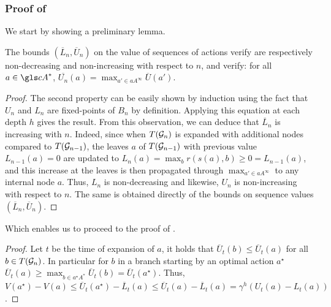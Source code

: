 \subsubsection{Proof of }
\label{sec:proof-expansion-bound}
We start by showing a preliminary lemma.
\begin{lemma}
	\begin{leftbar}[lemmabar]
	\label{lem:bounds}
	The bounds $(\overline{L}_n, \overline{U}_n)$ on the value of sequences of actions verify are respectively non-decreasing and non-increasing with respect to $n$, and verify: for all $a\in \cA^*$, $\overline{U_n}(a) = \max_{a'\in a A^\infty} \overline{U}(a')$.
	\end{leftbar}
\end{lemma}
\begin{proof}
	The second property can be easily shown by induction using the fact that $U_n$ and $L_n$ are fixed-points of $B_n$ by definition. Applying this equation at each depth $h$ gives the result. From this observation, we can deduce that $\overline{L}_n$ is increasing with $n$. Indeed, since when $T(\mathcal{G}_n)$ is expanded with additional nodes compared to $T(\mathcal{G}_{n-1})$, the leaves $a$ of $T(\mathcal{G}_{n-1})$ with previous value $L_{n-1}(a)=0$ are updated to $L_n(a) = \max_b r(s(a), b) \geq 0 = L_{n-1}(a)$, and this increase at the leaves is then propagated through $\max_{a'\in a A^\infty}$ to any internal node $a$. Thus, $L_n$ is non-decreasing and likewise, $U_n$ is non-increasing with respect to $n$. The same is obtained directly of the bounds on sequence values $(\overline{L}_n, \overline{U}_n)$.
\end{proof}

Which enables us to proceed to the proof of .
\begin{proof}
	Let $t$ be the time of expansion of $a$, it holds that $\overline{U}_t(b) \leq \overline{U}_t(a)$ for all $b\in T(\mathcal{G}_n)$. In particular for $b$ in a branch starting by an optimal action $a^\star$ $\overline{U}_t(a) \geq \max_{b\in a^\star A^*}  \overline{U}_t(b) = \overline{U}_t(a^\star)$. Thus, $V(a^\star)-V(a) \leq \overline{U}_t(a^\star) - \overline{L}_t(a) \leq \overline{U}_t(a) - \overline{L}_t(a) = \gamma^h(U_t(a)-L_t(a))$.
\end{proof}

